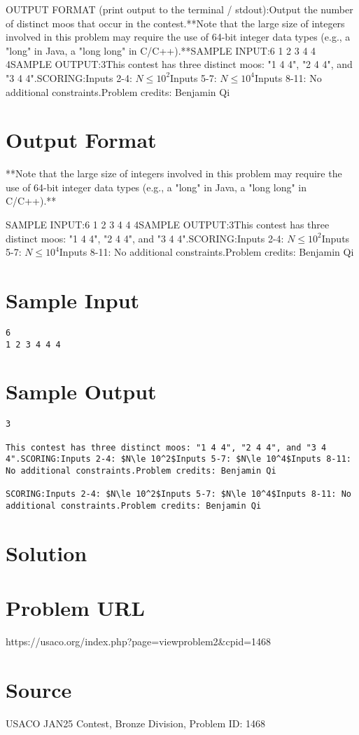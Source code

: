 \documentclass[12pt]{article}
\begin{document}
OUTPUT FORMAT (print output to the terminal / stdout):Output the number of distinct moos that occur in the contest.**Note that the large size of integers involved in this problem may require
the use of 64-bit integer data types (e.g., a "long" in Java, a "long long" in
C/C++).**SAMPLE INPUT:6
1 2 3 4 4 4SAMPLE OUTPUT:3This contest has three distinct moos: "1 4 4", "2 4 4", and "3 4 4".SCORING:Inputs 2-4: $N\le 10^2$Inputs 5-7: $N\le 10^4$Inputs 8-11: No additional constraints.Problem credits: Benjamin Qi

\section*{Output Format}
**Note that the large size of integers involved in this problem may require
the use of 64-bit integer data types (e.g., a "long" in Java, a "long long" in
C/C++).**

SAMPLE INPUT:6
1 2 3 4 4 4SAMPLE OUTPUT:3This contest has three distinct moos: "1 4 4", "2 4 4", and "3 4 4".SCORING:Inputs 2-4: $N\le 10^2$Inputs 5-7: $N\le 10^4$Inputs 8-11: No additional constraints.Problem credits: Benjamin Qi

\section*{Sample Input}
\begin{verbatim}
6
1 2 3 4 4 4
\end{verbatim}

\section*{Sample Output}
\begin{verbatim}
3

This contest has three distinct moos: "1 4 4", "2 4 4", and "3 4 4".SCORING:Inputs 2-4: $N\le 10^2$Inputs 5-7: $N\le 10^4$Inputs 8-11: No additional constraints.Problem credits: Benjamin Qi

SCORING:Inputs 2-4: $N\le 10^2$Inputs 5-7: $N\le 10^4$Inputs 8-11: No additional constraints.Problem credits: Benjamin Qi
\end{verbatim}

\section*{Solution}


\section*{Problem URL}
https://usaco.org/index.php?page=viewproblem2&cpid=1468

\section*{Source}
USACO JAN25 Contest, Bronze Division, Problem ID: 1468
\end{document}
